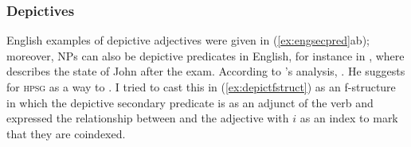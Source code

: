 \subsubsection{Depictives}

English examples of depictive adjectives were given in (\ref{ex:engsecpred}ab);
moreover, NPs can also be depictive predicates in English, for instance in 
, where 
describes the state of John after the exam. According to \citet{mueller2002}'s
analysis, . He suggests for \textsc{hpsg}  as a way to . I tried to cast this in
(\ref{ex:depictfstruct}) as an f-structure in which the depictive secondary
predicate is as an adjunct of the verb and expressed the relationship between
\Subj{} and the adjective with $i$ as an index to mark that they are coindexed.

